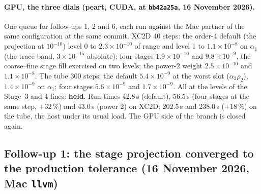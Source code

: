 \documentclass[11pt,a4paper]{article}
\newcommand{\code}[1]{\texttt{\small #1}}
\begin{document}
\paragraph{GPU, the three dials (peart, CUDA, at \code{bb42a25a}, 16 November 2026).}
One queue for follow-ups 1, 2 and 6, each run against the Mac partner
of the same configuration at the same commit.  XC2D 40 steps: the
order-4 default (the projection at $10^{-10}$) level 0 to
$2.3\times10^{-10}$ of range and level 1 to $1.1\times10^{-8}$ on
$\alpha_1$ (the trace band, $3\times10^{-15}$ absolute); four stages
$1.9\times10^{-10}$ and $9.8\times10^{-9}$, the coarse--fine stage fill
exercised on two levels; the power-2 weight $2.5\times10^{-10}$ and
$1.1\times10^{-8}$.  The tube 300 steps: the default $5.4\times10^{-9}$
at the worst slot ($\alpha_2\rho_2$), $1.4\times10^{-9}$ on $\alpha_1$;
four stages $5.6\times10^{-9}$ and $1.7\times10^{-9}$.  All at the
levels of the Stage~3 and 4 lines: \textbf{held}.  Run times 42.8\,s
(default), 56.5\,s (four stages at the same step, $+32\,\%$) and 43.0\,s
(power 2) on XC2D; 202.5\,s and 238.0\,s ($+18\,\%$) on the tube, the
host under its usual load.  The GPU side of the branch is closed again.

\subsection{Follow-up 1: the stage projection converged to the production tolerance (16 November 2026, Mac \code{llvm})}
\label{sec:fu1}
\end{document}
